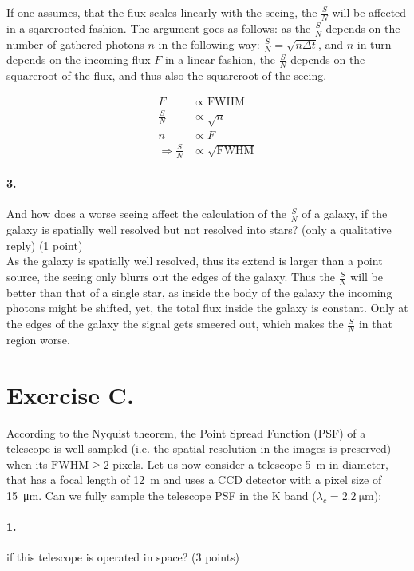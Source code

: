\documentclass[11pt,a4paper,twoside]{article}
\newcommand{\SNR}{\ensuremath{\frac{S}{N}} }
\begin{document}
If one assumes, that the flux scales linearly with the seeing, the \SNR will
be affected in a sqarerooted fashion. The argument goes as follows:
as the \SNR depends on the number of gathered photons $n$ in the following way:
$\SNR = \sqrt{n\Delta t}$, and $n$ in turn depends on the incoming flux $F$ in 
a linear fashion, the \SNR depends on the squareroot of the flux,  and thus
also the squareroot of the seeing.

\begin{align}
F       &\propto \mathrm{FWHM}    \\
\SNR    &\propto \sqrt{n}      \\
n       &\propto F              \\
\Rightarrow 
\SNR    &\propto \sqrt{\mathrm{FWHM}}
\end{align}

\paragraph{3.} And how does a worse seeing affect the calculation of the \SNR
of a galaxy, if the galaxy is spatially well resolved but not resolved into
stars? (only a qualitative reply) (1 point) \\

As the galaxy is spatially well resolved, thus its extend is larger than a
point source, the seeing only blurrs out the edges of the galaxy. Thus the
\SNR will be better than that of a single star, as inside the body of the galaxy
the incoming photons might be shifted, yet, the total flux inside the galaxy is
constant. Only at the edges of the galaxy the signal gets smeered out, which
makes the \SNR in that region worse.


\section*{Exercise C.}
According to the Nyquist theorem, the Point Spread Function (PSF) of a
telescope is well sampled (i.e. the spatial resolution in the images is
preserved) when its $\mathrm{FWHM} \geq 2$ pixels. Let us now consider a
telescope \SI{5}{\meter} in diameter, that has a focal length of
\SI{12}{\meter} and uses a CCD detector with a pixel size of
\SI{15}{\micro\meter}. Can we fully sample the telescope PSF in the K band
($\lambda_c = \SI{2.2}{\micro\meter}$):

\paragraph{1.} if this telescope is operated in space? (3 points)
\end{document}

